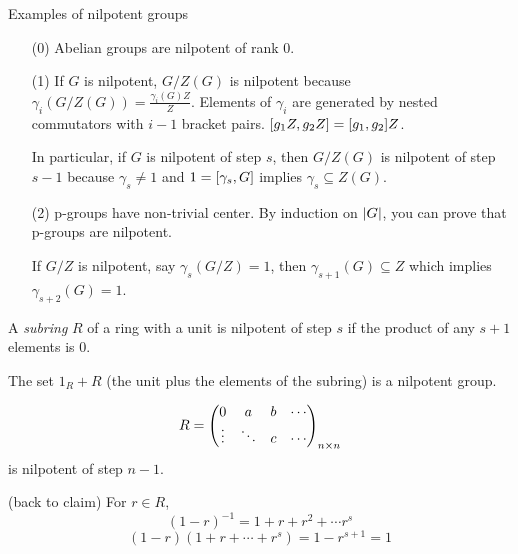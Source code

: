 \documentclass[a4paper,twoside,master.tex]{subfiles}
\begin{document}
Examples of nilpotent groups
\begin{itemize}
    \item[(0)] Abelian groups are nilpotent of rank $ 0 $.
    \item[(1)] If $ G $ is nilpotent, $ G/Z(G) $ is nilpotent because $ \gamma_i(G/Z(G)) = \frac{\gamma_i(G) Z}{Z} $. Elements of $ \gamma_i $ are generated by nested commutators with $ i-1 $ bracket pairs. $ \comm{g_1 Z}{g_2 Z} = \comm{g_1}{g_2} Z $.

        In particular, if $ G $ is nilpotent of step $ s $, then $ G/Z(G) $ is nilpotent of step $ s-1 $ because $ \gamma_s \neq 1 $ and $ 1 = \comm{\gamma_s}{G} $ implies $ \gamma_s \subseteq Z(G) $.
    \item[(2)] p-groups have non-trivial center. By induction on $ \abs{G} $, you can prove that p-groups are nilpotent.

        If $ G/Z $ is nilpotent, say $ \gamma_s(G/Z) = 1 $, then $ \gamma_{s+1}(G) \subseteq Z $ which implies $ \gamma_{s+2}(G) = 1 $.
\end{itemize}

\begin{definition}
    A \textit{subring} $ R $ of a ring with a unit is nilpotent of step $ s $ if the product of any $ s+1 $ elements is $ 0 $.
\end{definition}

\begin{claim}
    The set $ 1_R + R $ (the unit plus the elements of the subring) is a nilpotent group.
\end{claim}

\begin{ex}
    \begin{equation}
        R = \mqty(0&a&b&\cdots\\\vdots&\ddots&c&\cdots)_{n \times n}
    \end{equation}
    is nilpotent of step $ n-1 $.
\end{ex}

(back to claim) For $ r \in R $,
\begin{equation}
    (1-r)^{-1} = 1 + r + r^2 + \cdots r^s
\end{equation}
\begin{equation}
    (1-r)(1+r+\cdots+r^s) = 1 - r^{s+1} = 1
\end{equation}
\end{document}
